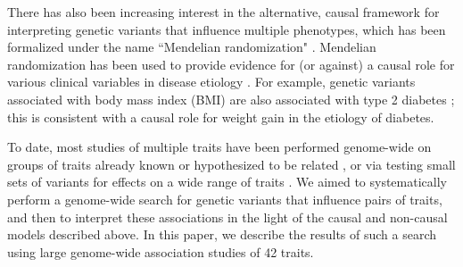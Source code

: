 \documentclass[11pt,titlepage]{article}
\begin{document}
There has also been increasing interest in the alternative, causal framework for interpreting genetic variants that influence multiple phenotypes, which has been formalized under the name ``Mendelian randomization" \citep{Katan:1986aa, smith2004mendelian, Davey-Smith:2014aa}. 
Mendelian randomization has been used to provide evidence for (or against) a causal role for various clinical variables in disease etiology \citep{Voight:2012aa, Lim:2014aa, Panoutsopoulou:2013aa, Holmes:2014aa, De-Silva:2011aa, Granell:2014aa, Pichler:2013aa}. 
For example, genetic variants associated with body mass index (BMI) are also associated with type 2 diabetes \citep{Holmes:2014aa}; this is consistent with a causal role for weight gain in the etiology of diabetes.

To date, most studies of multiple traits have been performed genome-wide on groups of traits already known or hypothesized to be related \citep{Cotsapas:2011aa, Parkes:2013aa, Fortune:2015aa, Cross-Disorder-Group-of-the-Psychiatric-Genomics-Consortium:2013aa}, or via testing small sets of variants for effects on a wide range of traits \citep{Denny:2013aa, Li:2014aa}. 
We aimed to systematically perform a genome-wide search for genetic variants that influence pairs of traits, and then to interpret these associations in the light of the causal and non-causal models described above.  
In this paper, we describe the results of such a search using large genome-wide association studies of 42 traits.  
\end{document}
